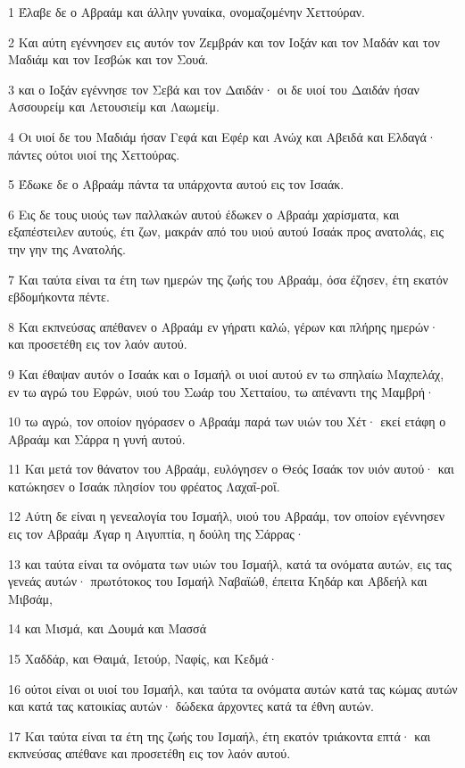 \par 1 Έλαβε δε ο Αβραάμ και άλλην γυναίκα, ονομαζομένην Χεττούραν.
\par 2 Και αύτη εγέννησεν εις αυτόν τον Ζεμβράν και τον Ιοξάν και τον Μαδάν και τον Μαδιάμ και τον Ιεσβώκ και τον Σουά.
\par 3 και ο Ιοξάν εγέννησε τον Σεβά και τον Δαιδάν· οι δε υιοί του Δαιδάν ήσαν Ασσουρείμ και Λετουσιείμ και Λαωμείμ.
\par 4 Οι υιοί δε του Μαδιάμ ήσαν Γεφά και Εφέρ και Ανώχ και Αβειδά και Ελδαγά· πάντες ούτοι υιοί της Χεττούρας.
\par 5 Έδωκε δε ο Αβραάμ πάντα τα υπάρχοντα αυτού εις τον Ισαάκ.
\par 6 Εις δε τους υιούς των παλλακών αυτού έδωκεν ο Αβραάμ χαρίσματα, και εξαπέστειλεν αυτούς, έτι ζων, μακράν από του υιού αυτού Ισαάκ προς ανατολάς, εις την γην της Ανατολής.
\par 7 Και ταύτα είναι τα έτη των ημερών της ζωής του Αβραάμ, όσα έζησεν, έτη εκατόν εβδομήκοντα πέντε.
\par 8 Και εκπνεύσας απέθανεν ο Αβραάμ εν γήρατι καλώ, γέρων και πλήρης ημερών· και προσετέθη εις τον λαόν αυτού.
\par 9 Και έθαψαν αυτόν ο Ισαάκ και ο Ισμαήλ οι υιοί αυτού εν τω σπηλαίω Μαχπελάχ, εν τω αγρώ του Εφρών, υιού του Σωάρ του Χετταίου, τω απέναντι της Μαμβρή·
\par 10 τω αγρώ, τον οποίον ηγόρασεν ο Αβραάμ παρά των υιών του Χέτ· εκεί ετάφη ο Αβραάμ και Σάρρα η γυνή αυτού.
\par 11 Και μετά τον θάνατον του Αβραάμ, ευλόγησεν ο Θεός Ισαάκ τον υιόν αυτού· και κατώκησεν ο Ισαάκ πλησίον του φρέατος Λαχαΐ-ροΐ.
\par 12 Αύτη δε είναι η γενεαλογία του Ισμαήλ, υιού του Αβραάμ, τον οποίον εγέννησεν εις τον Αβραάμ Άγαρ η Αιγυπτία, η δούλη της Σάρρας·
\par 13 και ταύτα είναι τα ονόματα των υιών του Ισμαήλ, κατά τα ονόματα αυτών, εις τας γενεάς αυτών· πρωτότοκος του Ισμαήλ Ναβαϊώθ, έπειτα Κηδάρ και Αβδεήλ και Μιβσάμ,
\par 14 και Μισμά, και Δουμά και Μασσά
\par 15 Χαδδάρ, και Θαιμά, Ιετούρ, Ναφίς, και Κεδμά·
\par 16 ούτοι είναι οι υιοί του Ισμαήλ, και ταύτα τα ονόματα αυτών κατά τας κώμας αυτών και κατά τας κατοικίας αυτών· δώδεκα άρχοντες κατά τα έθνη αυτών.
\par 17 Και ταύτα είναι τα έτη της ζωής του Ισμαήλ, έτη εκατόν τριάκοντα επτά· και εκπνεύσας απέθανε και προσετέθη εις τον λαόν αυτού.
